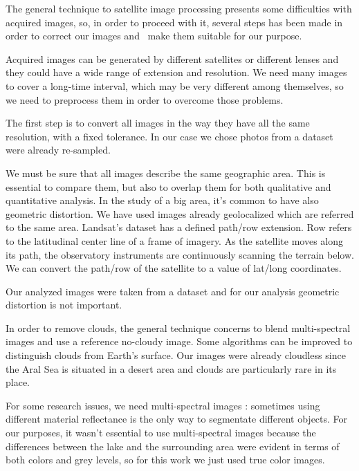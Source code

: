 The general technique to satellite image processing presents some difficulties with acquired images, so, in order to proceed with it, several steps has been made in order to correct our images and  make them suitable for our purpose.  

Acquired images can be generated by different satellites or different lenses and they could have a wide range of extension and resolution. 
We need many images to cover a long-time interval, which may be very different among themselves, so we need to preprocess them in order to overcome those problems. 

The first step is to convert all images in the way they have all the same resolution, with a fixed tolerance. 
In our case we chose photos from a dataset were already re-sampled. 

We must be sure that all images describe the same geographic area. This is essential to compare them, but also to overlap them for both qualitative and quantitative analysis. 
In the study of a big area, it’s common to have also geometric distortion. We have used images already geolocalized which are referred to the same area. 
Landsat’s dataset has a defined path/row extension. Row refers to the latitudinal center line of a frame of imagery. As the satellite moves along its path, the observatory instruments are continuously scanning the terrain below. 
We can convert the path/row of the satellite to a value of lat/long coordinates.  

Our analyzed images were taken from a dataset and for our analysis geometric distortion is not important. 

In order to remove clouds, the general technique concerns to blend multi-spectral images and use a reference no-cloudy image. 
Some algorithms can be improved to distinguish clouds from Earth’s surface. Our images were already cloudless since the Aral Sea is situated in a desert area and clouds are particularly rare in its place. 

For some research issues, we need multi-spectral images \cite{satelliteImg}: sometimes using different material reflectance is the only way to segmentate different objects. For our purposes, it wasn’t essential to use multi-spectral images because the differences between the lake and the surrounding area were evident in terms of both colors and grey levels, so for this work we just used true color images.  
